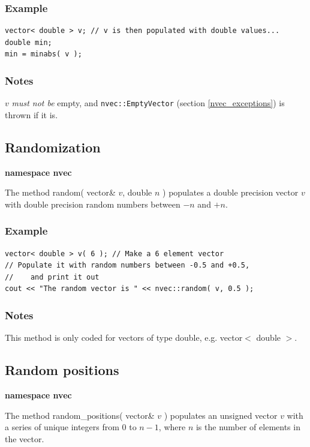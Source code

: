 \documentclass{report}
\begin{document}
\subsubsection{Example}
\begin{verbatim}
vector< double > v; // v is then populated with double values...
double min;
min = minabs( v );
\end{verbatim}

\subsubsection{Notes}
$v$ {\em must not be} empty, and \texttt{nvec::EmptyVector} (section
\ref{nvec_exceptions}) is thrown if it is.

\subsection{Randomization}

{\bf namespace nvec}

The method random( vector\& $v$, double $n$ ) populates a double
precision vector $v$ with double precision random numbers between $-n$
and $+n$.

\subsubsection{Example}

\begin{verbatim}
vector< double > v( 6 ); // Make a 6 element vector
// Populate it with random numbers between -0.5 and +0.5,
//    and print it out
cout << "The random vector is " << nvec::random( v, 0.5 );
\end{verbatim}

\subsubsection{Notes}
This method is only coded for vectors of type double, e.g. vector$<$
double $>$.

\subsection{Random positions}

{\bf namespace nvec}

The method random\_positions( vector\& $v$ ) populates an unsigned
vector $v$ with a series of unique integers from 0 to $n - 1$, where
$n$ is the number of elements in the vector.
\end{document}
